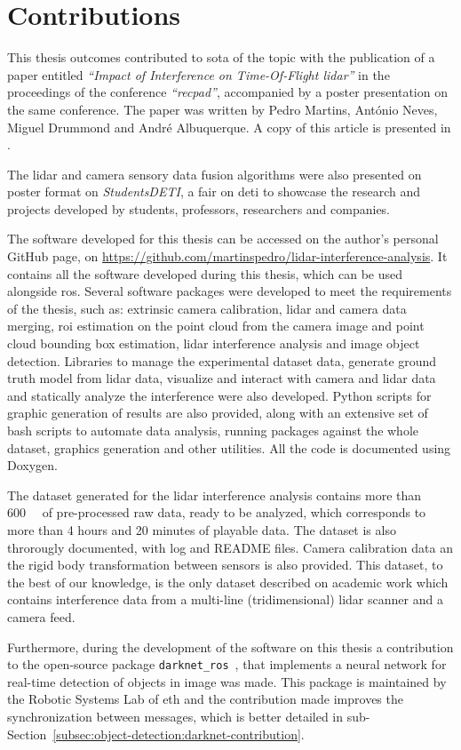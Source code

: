 \section{Contributions} 
\label{section:introduction:contributions}
This thesis outcomes contributed to \acl{sota} of the topic with the publication of a paper entitled \textit{``Impact of Interference on Time-Of-Flight \acs{lidar}''} in the proceedings of the conference \textit{``\acl{recpad}''}, accompanied by a poster presentation on the same conference. The paper was written by Pedro Martins, António Neves, Miguel Drummond and André Albuquerque. A copy of this article is presented in .

The \ac{lidar} and camera sensory data fusion algorithms were also presented on poster format on \textit{Students\@ DETI}, a fair on \acl{deti} to showcase the research and projects developed by students, professors, researchers and companies.

The software developed for this thesis can be accessed on the author's personal GitHub page, on \url{https://github.com/martinspedro/lidar-interference-analysis}. It contains all the software developed during this thesis, which can be used alongside \acf{ros}. Several software packages were developed to meet the requirements of the thesis, such as: extrinsic camera calibration, \ac{lidar} and camera data merging, \ac{roi} estimation on the point cloud from the camera image and point cloud bounding box estimation, \ac{lidar} interference analysis and image object detection. Libraries to manage the experimental dataset data, generate ground truth model from \ac{lidar} data, visualize and interact with camera and \ac{lidar} data and statically analyze the interference were also developed. Python scripts for graphic generation of results are also provided, along with an extensive set of bash scripts to automate data analysis, running packages against the whole dataset, graphics generation and other utilities. All the code is documented using Doxygen.

The dataset generated for the \ac{lidar} interference analysis contains more than \SI{600}{\giga\byte} of pre-processed raw data, ready to be analyzed, which corresponds to more than 4 hours and 20 minutes of playable data. The dataset is also throrougly documented, with log and README files. Camera calibration data an the rigid body transformation between sensors is also provided. This dataset, to the best of our knowledge, is the only dataset described on academic work which contains interference data from a multi-line (tridimensional) \ac{lidar} scanner and a camera feed.

Furthermore, during the development of the software on this thesis a contribution to the open-source package \texttt{darknet\_ros}~\cite{MarkoBjelonic}, that implements a neural network for real-time detection of objects in image was made. This package is maintained by the Robotic Systems Lab of \acl{eth} and the contribution made improves the synchronization between messages, which is better detailed in sub-Section~\ref{subsec:object-detection:darknet-contribution}.

